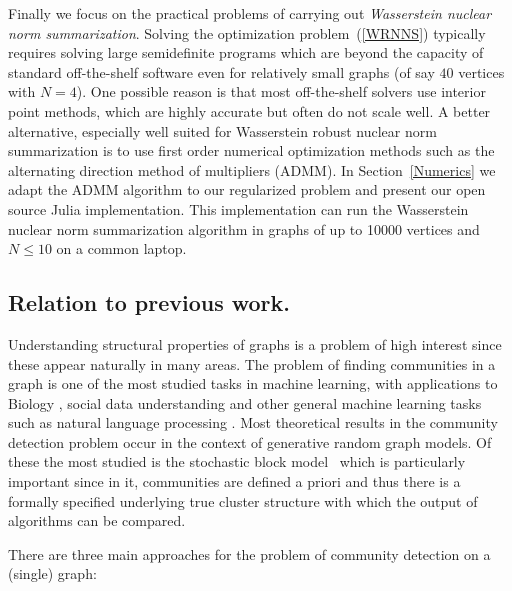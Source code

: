 \documentclass[12pt]{amsart}
\theoremstyle{remark}
\begin{document}
 
Finally we focus on the practical problems of carrying out {\it Wasserstein nuclear norm summarization}. Solving the optimization problem~(\ref{WRNNS}) typically requires solving large semidefinite programs which are beyond the  capacity of standard off-the-shelf software even for relatively small graphs (of say $40$ vertices with $N=4$). One possible reason is that most off-the-shelf solvers use interior point methods, which are highly accurate but often do not scale well. A better alternative, especially well suited for Wasserstein robust nuclear norm summarization is to use first order numerical optimization methods such as the alternating direction method of multipliers (ADMM). In Section~\ref{Numerics} we adapt the ADMM algorithm to our regularized problem and present our open source Julia implementation. This implementation can run the Wasserstein nuclear norm summarization algorithm in graphs of up to 10000 vertices and $N\leq 10$ on a common laptop. 

\subsection{Relation to previous work.}
\label{Sec: PreviousWork}

Understanding structural properties of graphs is a problem of high interest since these appear naturally in many areas. The problem of finding communities in a graph is one of the most studied tasks in machine learning, with  applications to Biology \cite{cabreros2016detecting, cline2007integration,xu2002clustering}, social data understanding \cite{domingos2001mining,mishra2007clustering,newman2002random} and other general machine learning tasks such as natural language processing \cite{collobert2011natural,ratinov2009design}. Most theoretical results in the community detection problem occur in the context of generative random graph models. Of these the most studied is the stochastic block model~\cite{abbe2017community} which is particularly important since in it, communities are defined a priori and thus there is a formally specified underlying true cluster structure with which the output of algorithms can be compared.

There are three main approaches for the problem of community detection on a (single) graph: 
\end{document}
